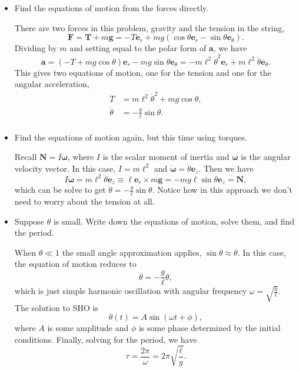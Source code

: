 \documentclass[
  letterpaper,
  DIV=11,
  numbers=noendperiod]{scrreprt}
\begin{document}
\begin{itemize}
\item
  Find the equations of motion from the forces directly.

  There are two forces in this problem, gravity and the tension in the
  string, \[
  \mathbf{F} = \mathbf{T} + m\mathbf{g} = -T\mathbf{e}_r + mg(\cos\theta \mathbf{e}_r - \sin\theta\mathbf{e}_\theta).
  \] Dividing by \(m\) and setting equal to the polar form of
  \(\mathbf{a}\), we have \[
  \mathbf{a} = (-T+mg\cos\theta)\mathbf{e}_r - mg\sin\theta\mathbf{e}_\theta = -m\ell^2 \dot \theta^2 \mathbf{e}_r + m\ell^2 \ddot \theta \mathbf{e}_\theta.
  \] This gives two equations of motion, one for the tension and one for
  the angular acceleration, \[
  \begin{align*}
  T &= m\ell^2 \dot\theta^2 + mg\cos\theta, \\
  \ddot \theta &= -\frac{g}{\ell} \sin\theta. \\
  \end{align*}
  \]
\item
  Find the equations of motion again, but this time using torques.

  Recall \(\mathbf{N} = I \boldsymbol{\dot \omega}\), where \(I\) is the
  scalar moment of inertia and \(\boldsymbol{\omega}\) is the angular
  velocity vector. In this case, \(I=m\ell^2\) and
  \(\boldsymbol{\dot \omega} = \ddot \theta \mathbf{e}_z\). Then we have
  \[
  I \boldsymbol{\dot \omega} = m\ell^2 \ddot \theta \mathbf{e}_z \equiv \ell\mathbf{e}_r \times m\mathbf{g} = -mg\ell\sin\theta \mathbf{e}_z = \mathbf{N},
  \] which can be solve to get
  \(\ddot \theta = -\frac{g}{\ell}\sin\theta\). Notice how in this
  approach we don't need to worry about the tension at all.
\item
  Suppose \(\theta\) is small. Write down the equations of motion, solve
  them, and find the period.

  When \(\theta \ll 1\) the small angle approximation applies,
  \(\sin\theta \approx \theta\). In this case, the equation of motion
  reduces to \[\ddot \theta = -\frac{g}{\ell} \theta,\] which is just
  simple harmonic oscillation with angular frequency
  \(\omega = \sqrt{\frac{g}{\ell}}\). The solution to SHO is \[
  \theta(t) = A\sin(\omega t + \phi),
  \] where \(A\) is some amplitude and \(\phi\) is some phase determined
  by the initial conditions. Finally, solving for the period, we have \[
  \tau = \frac{2\pi}{\omega} = 2\pi\sqrt{\frac{\ell}{g}}.
  \]
\end{itemize}
\end{document}
